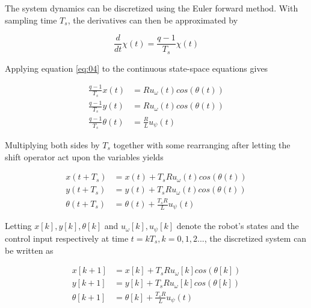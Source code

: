 The system dynamics can be discretized using the Euler forward method.
With sampling time $T_s$, the derivatives can then be approximated by

\begin{equation}
	\frac{d}{dt}\chi(t) = \frac{q-1}{T_s}\chi(t)
	\label{eq:04}
\end{equation}

Applying equation \ref{eq:04} to the continuous state-space equations gives

\begin{align*}
  \frac{q-1}{T_s}x(t) &=  R u_\omega(t)cos(\theta(t))	\\
  \frac{q-1}{T_s}y(t) &=  R u_\omega(t)cos(\theta(t))	\\
  \frac{q-1}{T_s}\theta(t) &=  \frac{R}{L}u_\psi(t)
\end{align*}

Multiplying both sides by $T_s$ together with some rearranging after letting
the shift operator act upon the variables yields

\begin{align*}
  x(t+T_s) &= x(t)+ T_s R u_\omega(t)cos(\theta(t))	\\
  y(t+T_s) &= y(t) + T_s R u_\omega(t)cos(\theta(t))	\\
  \theta(t+T_s) &= \theta(t) + \frac{T_s R}{L}u_\psi(t)
\end{align*}

Letting $x[k], y[k], \theta[k]$ and  $u_\omega[k], u_\psi[k]$ denote the robot's
states and the control input respectively at time $t = kT_s, k = 0,1,2...$, the
discretized system can be written as

\begin{align*}
  x[k+1] &= x[k] + T_s R u_\omega[k]cos(\theta[k])	\\
  y[k+1] &= y[k] + T_s R u_\omega[k]cos(\theta[k])	\\
  \theta[k+1]  &= \theta[k] + \frac{T_s R}{L}u_\psi(t)
\end{align*}
